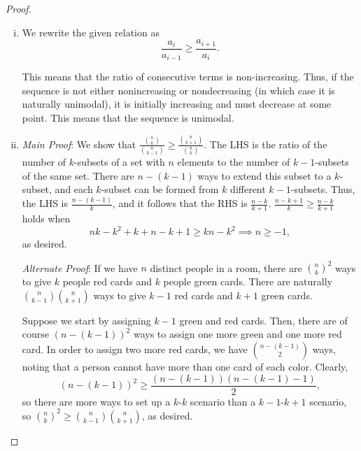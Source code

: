 \documentclass[11pt]{scrartcl}
\begin{document}
\begin{proof}
    \begin{enumerate}[(i)]
        \item We rewrite the given relation as 
        \[
            \frac{a_i}{a_{i-1}} \ge \frac{a_{i+1}}{a_i}.
        \]
        
        This means that the ratio of consecutive terms is non-increasing. Thus, if the sequence is not either nonincreasing or nondecreasing (in which case it is naturally unimodal), it is initially increasing and must decrease at some point. This means that the sequence is unimodal.
        \item \textit{Main Proof}: We show that $\frac{\binom{n}{k}}{\binom{n}{k-1}}\geq\frac{\binom{n}{k+1}}{\binom n k}$. The LHS is the ratio of the number of $k$-subsets of a set with $n$ elements to the number of $k-1$-subsets of the same set. There are $n-(k-1)$ ways to extend this subset to a $k$-subset, and each $k$-subset can be formed from $k$ different $k-1$-subsets. Thus, the LHS is $\frac{n-(k-1)}{k}$, and it follows that the RHS is $\frac{n-k}{k+1}$. $\frac{n-k+1}{k}\geq \frac{n-k}{k+1}$ holds when \[nk-k^2+k+n-k+1\geq kn-k^2\implies n\geq -1,\] as desired.

        \textit{Alternate Proof}: If we have $n$ distinct people in a room, there are $\binom nk ^2$ ways to give $k$ people red cards and $k$ people green cards. There are naturally $\binom n{k-1}\binom n{k+1}$ ways to give $k-1$ red cards and $k+1$ green cards. 

        Suppose we start by assigning $k-1$ green and red cards. Then, there are of course $(n-(k-1))^2$ ways to assign one more green and one more red card. In order to assign two more red cards, we have $\binom{n-(k-1)}{2}$ ways, noting that a person cannot have more than one card of each color. Clearly, \[(n-(k-1))^2\geq \frac{(n-(k-1))(n-(k-1)-1)}{2},\] so there are more ways to set up a $k$-$k$ scenario than a $k-1$-$k+1$ scenario, so $\binom n k ^2\geq \binom{n}{k-1}\binom{n}{k+1}$, as desired.
    \end{enumerate}
\end{proof}
\end{document}
